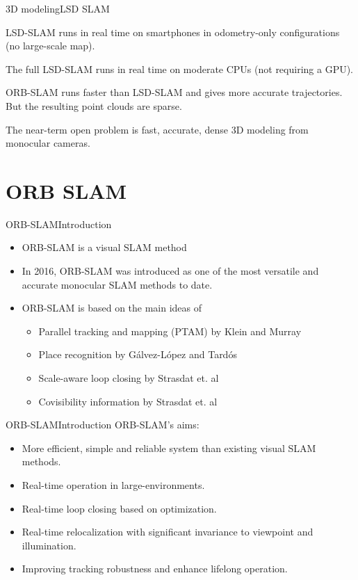 \documentclass[aspectratio=169]{beamer}
\begin{document}
\begin{frame}{3D modeling}{LSD SLAM}

  LSD-SLAM runs in real time on smartphones in odometry-only
  configurations (no large-scale map).

  \medskip

  The full LSD-SLAM runs in real time on moderate CPUs (not requiring
  a GPU).

  \medskip

  ORB-SLAM runs faster than LSD-SLAM and gives more accurate
  trajectories. But the resulting point clouds are sparse.

  \medskip

  The near-term open problem is fast, accurate, dense 3D modeling from
  monocular cameras.

\end{frame}

\section{ORB SLAM}

\begin{frame}{ORB-SLAM}{Introduction}
  \begin{itemize}
  \item ORB-SLAM is a visual SLAM method
  \item In 2016, ORB-SLAM was introduced as one of the most versatile
    and accurate monocular SLAM methods to date.
  \item ORB-SLAM is based on the main ideas of
    \begin{itemize}
    \item Parallel tracking and mapping (PTAM) by Klein and Murray 
    \item
      Place recognition by G{\'a}lvez-L{\'o}pez and Tard{\'o}s 
    \item
      Scale-aware loop closing by Strasdat et. al 
    \item
      Covisibility information by Strasdat et. al
    \end{itemize}
  \end{itemize}
\end{frame}


\begin{frame}{ORB-SLAM}{Introduction}
ORB-SLAM's aims:
\begin{itemize}
    \item More efficient, simple and reliable system than existing
	    visual SLAM methods.
    \item Real-time operation in large-environments.
    \item Real-time loop closing based on optimization.
    \item Real-time relocalization with significant invariance to viewpoint
	    and illumination.
    \item Improving tracking robustness and enhance lifelong operation.
  \end{itemize}
\end{frame}
\end{document}

